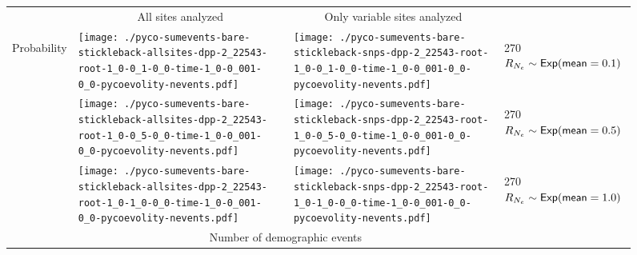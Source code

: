 \documentclass[border=10pt,varwidth=30cm]{standalone}
\begin{document}
\begin{figure}
    \centering
    \begin{tabular}{@{}llll@{}}
        & \multicolumn{1}{c}{\large All sites analyzed} & \multicolumn{1}{c}{\large Only variable sites analyzed} & \\[1ex]
        \multirow{2}{*}[-4em]{\begin{sideways}\large Probability\end{sideways}}
        & \texttt{[image: ./pyco-sumevents-bare-stickleback-allsites-dpp-2\_22543-root-1\_0-0\_1-0\_0-time-1\_0-0\_001-0\_0-pycoevolity-nevents.pdf]}
        & \texttt{[image: ./pyco-sumevents-bare-stickleback-snps-dpp-2\_22543-root-1\_0-0\_1-0\_0-time-1\_0-0\_001-0\_0-pycoevolity-nevents.pdf]}
        & \multirow{1}{*}[11em]{\begin{rotate}{270}$R_{N_e} \sim \textrm{\sffamily Exp}(\textrm{\sffamily mean}=0.1)$\end{rotate}} \\
        & \texttt{[image: ./pyco-sumevents-bare-stickleback-allsites-dpp-2\_22543-root-1\_0-0\_5-0\_0-time-1\_0-0\_001-0\_0-pycoevolity-nevents.pdf]}
        & \texttt{[image: ./pyco-sumevents-bare-stickleback-snps-dpp-2\_22543-root-1\_0-0\_5-0\_0-time-1\_0-0\_001-0\_0-pycoevolity-nevents.pdf]}
        & \multirow{1}{*}[11em]{\begin{rotate}{270}$R_{N_e} \sim \textrm{\sffamily Exp}(\textrm{\sffamily mean}=0.5)$\end{rotate}} \\
        & \texttt{[image: ./pyco-sumevents-bare-stickleback-allsites-dpp-2\_22543-root-1\_0-1\_0-0\_0-time-1\_0-0\_001-0\_0-pycoevolity-nevents.pdf]}
        & \texttt{[image: ./pyco-sumevents-bare-stickleback-snps-dpp-2\_22543-root-1\_0-1\_0-0\_0-time-1\_0-0\_001-0\_0-pycoevolity-nevents.pdf]}
        & \multirow{1}{*}[11em]{\begin{rotate}{270}$R_{N_e} \sim \textrm{\sffamily Exp}(\textrm{\sffamily mean}=1.0)$\end{rotate}} \\
        & \multicolumn{2}{c}{\large Number of demographic events} & 
    \end{tabular}
\end{figure}
\end{document}
